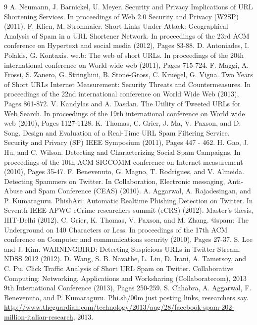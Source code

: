 \documentclass[conference]{IEEEtran}
\begin{document}
\begin{thebibliography} {9}
 A. Neumann, J. Barnickel, U. Meyer. Security and Privacy Implications of URL Shortening Services. In proceedings of Web 2.0 Security and Privacy (W2SP) (2011).
 F. Klien, M. Strohmaier. Short Links Under Attack: Geographical Analysis of Spam in a URL Shortener Network. In proceedings of the 23rd ACM conference on Hypertext and social media (2012), Pages 83-88. 
 D. Antoniades, I. Polakis, G. Kontaxis. we.b: The web of short URLs. In proceedings of the 20th international conference on World wide web (2011), Pages 715-724. 
 F. Maggi, A. Frossi, S. Zanero, G. Stringhini, B. Stone-Gross, C. Kruegel, G. Vigna. Two Years of Short URLs Internet Measurement: Security Threats and Countermeasures. In proceedings of the 22nd international conference on World Wide Web (2013), Pages 861-872. 
 V. Kandylas and A. Dasdan. The Utility of Tweeted URLs for Web Search. In proceedings of the 19th international conference on World wide web (2010), Pages 1127-1128.  
 K. Thomas, C. Grier, J. Ma, V. Paxson, and D. Song. Design and Evaluation of a Real-Time URL Spam Filtering Service. Security and Privacy (SP) IEEE Symposium (2011), Pages 447 - 462.
 H. Gao, J. Hu, and C. Wilson. Detecting and Characterizing Social Spam Campaigns. In proceedings of the 10th ACM SIGCOMM conference on Internet measurement (2010), Pages 35-47.
 F. Benevenuto, G. Magno, T. Rodrigues, and V. Almeida. Detecting Spammers on Twitter. In Collaboration, Electronic messaging, Anti-Abuse and Spam Conference (CEAS) (2010).
 A. Aggarwal, A. Rajadesingan, and P. Kumaraguru. PhishAri: Automatic Realtime Phishing Detection on Twitter.  In Seventh IEEE APWG eCrime researchers summit (eCRS) (2012). Master's thesis, IIIT-Delhi (2012).
 C. Grier, K. Thomas, V. Paxson, and M. Zhang. @spam: The Underground on 140 Characters or Less. In proceedings of the 17th ACM conference on Computer and communications security (2010), Pages 27-37.
 S. Lee and J. Kim. WARNINGBIRD: Detecting Suspicious URLs in Twitter Stream. NDSS 2012 (2012).
 D. Wang, S. B. Navathe, L. Liu, D. Irani, A. Tamersoy, and C. Pu. Click Traffic Analysis of Short URL Spam on Twitter. Collaborative Computing: Networking, Applications and Worksharing (Collaboratecom), 2013 9th International Conference (2013), Pages 250-259.
 S. Chhabra, A. Aggarwal, F. Benevenuto, and P. Kumaraguru. Phi.sh/\200m just posting links, researchers say. \url{http://www.theguardian.com/technology/2013/aug/28/facebook-spam-202-million-italian-research}, 2013.

\end{thebibliography}
\end{document}
